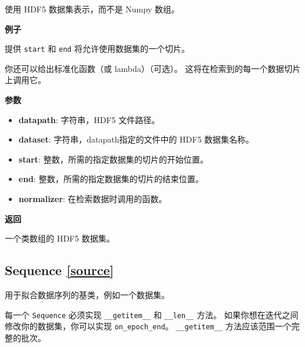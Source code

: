 使用 HDF5 数据集表示，而不是 Numpy 数组。

\textbf{例子}

\begin{Shaded}
\begin{Highlighting}[]
\OperatorTok{=} \NormalTok{, }\NormalTok{)}
\end{Highlighting}
\end{Shaded}

提供 \texttt{start} 和 \texttt{end} 将允许使用数据集的一个切片。

你还可以给出标准化函数（或 lambda）（可选）。
这将在检索到的每一个数据切片上调用它。

\textbf{参数}

\begin{itemize}
\tightlist
\item
  \textbf{datapath}: 字符串，HDF5 文件路径。
\item
  \textbf{dataset}: 字符串，datapath指定的文件中的 HDF5 数据集名称。
\item
  \textbf{start}: 整数，所需的指定数据集的切片的开始位置。
\item
  \textbf{end}: 整数，所需的指定数据集的切片的结束位置。
\item
  \textbf{normalizer}: 在检索数据时调用的函数。
\end{itemize}

\textbf{返回}

一个类数组的 HDF5 数据集。




\subsection{ Sequence {\href{https://github.com/keras-team/keras/blob/master/keras/utils/data_utils.py\#L303}{{[}source{]}}}}

\begin{Shaded}
\begin{Highlighting}[]
\end{Highlighting}
\end{Shaded}

用于拟合数据序列的基类，例如一个数据集。

每一个 \texttt{Sequence} 必须实现 \texttt{\_\_getitem\_\_} 和
\texttt{\_\_len\_\_} 方法。 如果你想在迭代之间修改你的数据集，你可以实现
\texttt{on\_epoch\_end}。 \texttt{\_\_getitem\_\_}
方法应该范围一个完整的批次。

